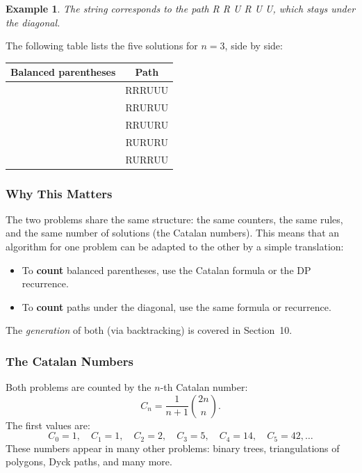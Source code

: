 \documentclass[11pt,a4paper]{article}
\newtheorem{example}[theorem]{Example}
\newcommand{\code}[1]{\texttt{\detokenize{#1}}}
\begin{document}
\begin{example}
The string \code{(()())} corresponds to the path R R U R U U, which stays under the diagonal.
\end{example}

The following table lists the five solutions for \( n = 3 \), side by side:

\begin{center}
\begin{tabular}{cc}
\toprule
Balanced parentheses & Path \\
\midrule
\code{((()))} & RRRUUU \\
\code{(()())} & RRURUU \\
\code{(())()} & RRUURU \\
\code{()(())} & RURURU \\
\code{()()()} & RURRUU \\
\bottomrule
\end{tabular}
\end{center}

\subsubsection{Why This Matters}

The two problems share the same structure: the same counters, the same rules, and the same number of solutions (the Catalan numbers). This means that an algorithm for one problem can be adapted to the other by a simple translation:
\begin{itemize}
    \item To \textbf{count} balanced parentheses, use the Catalan formula or the DP recurrence.
    \item To \textbf{count} paths under the diagonal, use the same formula or recurrence.
\end{itemize}

The \emph{generation} of both (via backtracking) is covered in Section~10.

\subsubsection{The Catalan Numbers}

Both problems are counted by the \( n \)-th Catalan number:
\[
C_n = \frac{1}{n+1} \binom{2n}{n}.
\]
The first values are:
\[
C_0 = 1, \quad C_1 = 1, \quad C_2 = 2, \quad C_3 = 5, \quad C_4 = 14, \quad C_5 = 42, \dots
\]
These numbers appear in many other problems: binary trees, triangulations of polygons, Dyck paths, and many more.
\end{document}
